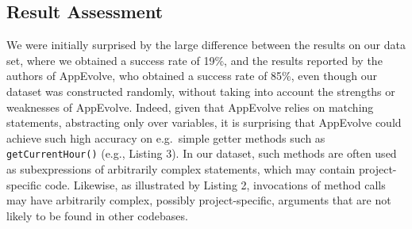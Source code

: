 %
%

\subsection{Result Assessment}

We were initially surprised by the large difference between the results on
our data set, where we obtained a success rate of 19\%, and the results
reported by the authors of AppEvolve, who obtained a success rate of
85\%, even though our dataset was constructed randomly, without taking
into account the strengths or weaknesses of AppEvolve.  Indeed, given that
AppEvolve relies on matching statements, abstracting only over variables,
it is surprising that AppEvolve could achieve such high accuracy on
e.g.\ simple getter methods such as {\tt getCurrentHour()} (e.g., Listing
3). In our dataset, such methods are often used as subexpressions of
arbitrarily complex statements, which may contain project-specific code.
Likewise, as illustrated by Listing 2, invocations of method calls may have
arbitrarily complex, possibly project-specific, arguments that are not
likely to be found in other codebases.

